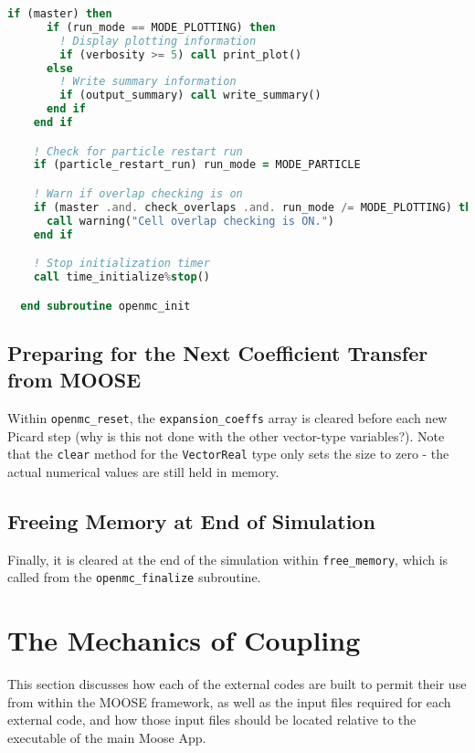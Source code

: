 \documentclass[10pt]{article}
\numberwithin{equation}{section} %
\begin{document}
\begin{lstlisting}[language=fortran]
    if (master) then
      if (run_mode == MODE_PLOTTING) then
        ! Display plotting information
        if (verbosity >= 5) call print_plot()
      else
        ! Write summary information
        if (output_summary) call write_summary()
      end if
    end if

    ! Check for particle restart run
    if (particle_restart_run) run_mode = MODE_PARTICLE

    ! Warn if overlap checking is on
    if (master .and. check_overlaps .and. run_mode /= MODE_PLOTTING) then
      call warning("Cell overlap checking is ON.")
    end if

    ! Stop initialization timer
    call time_initialize%stop()

  end subroutine openmc_init
\end{lstlisting}








\subsection{Preparing for the Next Coefficient Transfer from MOOSE}
Within {\tt openmc\_reset}, the {\tt expansion\_coeffs} array is cleared before each new Picard step (why is this not done with the other vector-type variables?). Note that the {\tt clear} method for the {\tt VectorReal} type only sets the size to zero - the actual numerical values are still held in memory. 

\subsection{Freeing Memory at End of Simulation}
Finally, it is cleared at the end of the simulation within {\tt free\_memory}, which is called from the {\tt openmc\_finalize} subroutine.








\section{The Mechanics of Coupling}
This section discusses how each of the external codes are built to permit their use from within the MOOSE framework, as well as the input files required for each external code, and how those input files should be located relative to the executable of the main Moose App.
\end{document}
